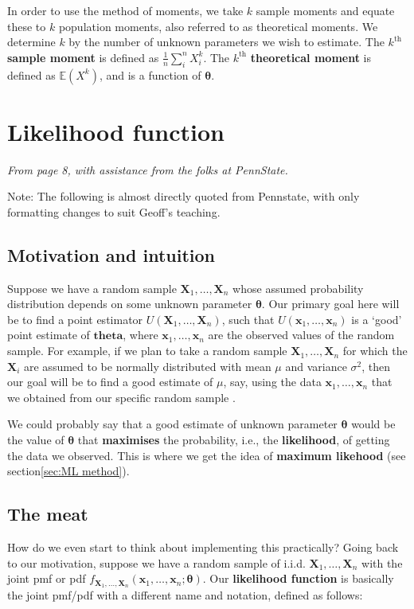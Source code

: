In order to use the method of moments, we take \(k\) sample moments and equate these to \(k\) population moments, also referred to as theoretical moments. 
We determine \(k\) by the number of unknown parameters we wish to estimate. 
The \(k^{\text{th}}\) \textbf{sample moment} is defined as \(\frac{1}{n}\sum_{i}^{n}X_i^k\). 
The \(k^{\text{th}}\) \textbf{theoretical moment} is defined as \(\mathbb{E}(X^k)\), and is a function of \(\bm{\theta}\).

\section{Likelihood function}\label{sec:likelihood func}

\textit{From page 8, with assistance from the folks at PennState.\autocite{penn415}}

Note: The following is almost directly quoted from Pennstate, with only formatting changes to suit Geoff's teaching.

\medskip

\subsection{Motivation and intuition}
Suppose we have a random sample \(\bm{X}_1,\ldots,\bm{X}_n\) whose assumed probability distribution depends on some unknown parameter \(\bm{\theta}\). 
Our primary goal here will be to find a point estimator \(U(\bm{X}_1,\ldots,\bm{X}_n)\), such that \(U(\bm{x}_1,\ldots,\bm{x}_n)\) is a `good' point estimate of \(\bm{theta}\), where \(\bm{x}_1,\ldots,\bm{x}_n\) are the observed values of the random sample. 
For example, if we plan to take a random sample \(\bm{X}_1,\ldots,\bm{X}_n\) for which the \(\bm{X}_i\) are assumed to be normally distributed with mean \(\mu\) and variance \(\sigma^2\), then our goal will be to find a good estimate of \(\mu\), say, using the data \(\bm{x}_1,\ldots,\bm{x}_n\) that we obtained from our specific random sample \autocite{penn415}.

\bigskip

We could probably say that a good estimate of unknown parameter \(\bm{\theta}\) would be the value of \(\bm{\theta}\) that \textbf{maximises} the probability, i.e., the \textbf{likelihood}, of getting the data we observed. 
This is where we get the idea of \textbf{maximum likehood} (see section\ref{sec:ML method}). 

\subsection{The meat}
How do we even start to think about implementing this practically?
Going back to our motivation, suppose we have a random sample of i.i.d. \(\bm{X}_1,\ldots,\bm{X}_n\) with the joint pmf or pdf \(f_{\bm{X}_1,\ldots,\bm{X}_n}(\bm{x}_1,\ldots,\bm{x}_n;\bm{\theta})\). 
Our \textbf{likelihood function} is basically the joint pmf/pdf with a different name and notation, defined as follows:

